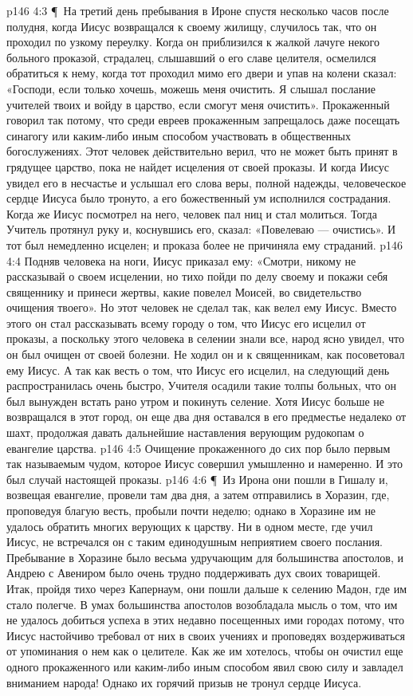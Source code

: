 \vs p146 4:3 \P\ На третий день пребывания в Ироне спустя несколько часов после полудня, когда Иисус возвращался к своему жилищу, случилось так, что он проходил по узкому переулку. Когда он приблизился к жалкой лачуге некого больного проказой, страдалец, слышавший о его славе целителя, осмелился обратиться к нему, когда тот проходил мимо его двери и упав на колени сказал: «Господи, если только хочешь, можешь меня очистить. Я слышал послание учителей твоих и войду в царство, если смогут меня очистить». Прокаженный говорил так потому, что среди евреев прокаженным запрещалось даже посещать синагогу или каким\hyp{}либо иным способом участвовать в общественных богослужениях. Этот человек действительно верил, что не может быть принят в грядущее царство, пока не найдет исцеления от своей проказы. И когда Иисус увидел его в несчастье и услышал его слова веры, полной надежды, человеческое сердце Иисуса было тронуто, а его божественный ум исполнился сострадания. Когда же Иисус посмотрел на него, человек пал ниц и стал молиться. Тогда Учитель протянул руку и, коснувшись его, сказал: «Повелеваю --- очистись». И тот был немедленно исцелен; и проказа более не причиняла ему страданий.
\vs p146 4:4 Подняв человека на ноги, Иисус приказал ему: «Смотри, никому не рассказывай о своем исцелении, но тихо пойди по делу своему и покажи себя священнику и принеси жертвы, какие повелел Моисей, во свидетельство очищения твоего». Но этот человек не сделал так, как велел ему Иисус. Вместо этого он стал рассказывать всему городу о том, что Иисус его исцелил от проказы, а поскольку этого человека в селении знали все, народ ясно увидел, что он был очищен от своей болезни. Не ходил он и к священникам, как посоветовал ему Иисус. А так как весть о том, что Иисус его исцелил, на следующий день распространилась очень быстро, Учителя осадили такие толпы больных, что он был вынужден встать рано утром и покинуть селение. Хотя Иисус больше не возвращался в этот город, он еще два дня оставался в его предместье недалеко от шахт, продолжая давать дальнейшие наставления верующим рудокопам о евангелие царства.
\vs p146 4:5 Очищение прокаженного до сих пор было первым так называемым чудом, которое Иисус совершил умышленно и намеренно. И это был случай настоящей проказы.
\vs p146 4:6 \P\ Из Ирона они пошли в Гишалу и, возвещая евангелие, провели там два дня, а затем отправились в Хоразин, где, проповедуя благую весть, пробыли почти неделю; однако в Хоразине им не удалось обратить многих верующих к царству. Ни в одном месте, где учил Иисус, не встречался он с таким единодушным неприятием своего послания. Пребывание в Хоразине было весьма удручающим для большинства апостолов, и Андрею с Авениром было очень трудно поддерживать дух своих товарищей. Итак, пройдя тихо через Капернаум, они пошли дальше к селению Мадон, где им стало полегче. В умах большинства апостолов возобладала мысль о том, что им не удалось добиться успеха в этих недавно посещенных ими городах потому, что Иисус настойчиво требовал от них в своих учениях и проповедях воздерживаться от упоминания о нем как о целителе. Как же им хотелось, чтобы он очистил еще одного прокаженного или каким\hyp{}либо иным способом явил свою силу и завладел вниманием народа! Однако их горячий призыв не тронул сердце Иисуса.

